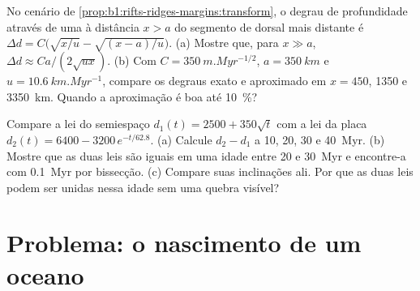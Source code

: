 \begin{exercise}[$\star\star\star$]\label{exo:b1:rifts-ridges-margins:11}
No cenário de \cref{prop:b1:rifts-ridges-margins:transform}, o degrau de profundidade
através de uma  à distância $x > a$ do segmento de dorsal mais distante
é $\Delta d = C\bigl(\sqrt{x/u} - \sqrt{(x - a)/u}\bigr)$. (a) Mostre que, para
$x \gg a$, $\Delta d \approx Ca/(2\sqrt{ux})$. (b) Com
$C = \qty{350}{m.Myr^{-1/2}}$, $a = \qty{350}{km}$ e
$u = \qty{10.6}{km.Myr^{-1}}$, compare os degraus exato e aproximado em
$x = 450$, 1350 e \qty{3350}{km}. Quando a aproximação é boa até
\qty{10}{\percent}?
\end{exercise}

\begin{exercise}[$\star\star\star$]\label{exo:b1:rifts-ridges-margins:12}
Compare a lei do semiespaço $d_1(t) = 2500 + 350\sqrt t$ com a lei da placa
$d_2(t) = 6400 - 3200\,e^{-t/62.8}$. (a) Calcule $d_2 - d_1$ a 10, 20, 30 e
\qty{40}{Myr}. (b) Mostre que as duas leis são iguais em uma idade entre 20 e
\qty{30}{Myr} e encontre-a com \qty{0.1}{Myr} por bissecção. (c) Compare suas
inclinações ali. Por que as duas leis podem ser unidas nessa idade sem uma quebra visível?
\end{exercise}

\section{Problema: o nascimento de um oceano}

